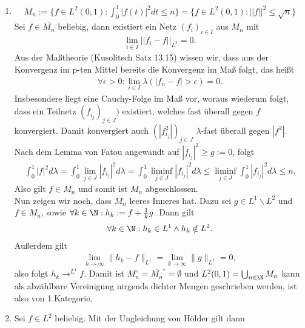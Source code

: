 \begin{solution}

\begin{enumerate}[label = (\roman*)]
\item \begin{align*}
  M_n := \{ f \in L^2(0,1): \int_0^1 |f(t)|^2dt \leq n \}
  = \{ f \in L^2(0,1): ||f||^2 \leq \sqrt{n}\}
\end{align*}
Sei $f \in \overline{M_n}$ beliebig, dann existiert ein Netz $(f_i)_{i \in I}$ aus $M_n$ mit
\begin{align*}
  \lim_{i \in I}||f_i - f||_{L^2} = 0.
\end{align*}
Aus der Maßtheorie (Kusolitsch Satz 13.15) wissen wir, dass aus der Konvergenz im
p-ten Mittel bereits die Konvergenz im Maß folgt, das heißt
\begin{align*}
  \forall \epsilon > 0: \lim_{i \in I} \lambda(|f_n - f| > \epsilon) = 0.
\end{align*}
Insbesondere liegt eine Cauchy-Folge im Maß vor, woraus wiederum folgt, dass ein
Teilnetz $(f_{i_j})_{j \in J})$ existiert, welches fast überall gegen $f$ konvergiert.
Damit konvergiert auch $(|f_{i_j}^2|)_{j \in J}$ $\lambda$-fast überall gegen $|f^2|$.
Nach dem Lemma von Fatou angewandt auf $|f_{i_j}|^2 \geq g := 0$, folgt
\begin{align*}
  \int_0^1 |f|^2 d\lambda = \int_0^1 \lim_{j \in J}|f_{i_j}|^2 d\lambda
  = \int_0^1 \liminf_{j \in J}|f_{i_j}|^2 d\lambda \leq \liminf_{j \in J} \int_0^1 |f_{i_j}|^2 d\lambda \leq n.
\end{align*}
Also gilt $f \in M_n$ und somit ist $M_n$ abgeschlossen. \\
Nun zeigen wir noch, dass $M_n$ leeres Inneres hat. Dazu sei $g \in L^1\backslash L^2$
und $f \in M_n$, sowie $\forall k \in \N: h_k := f + \frac{1}{k}g$. Dann gilt
\begin{align*}
  \forall k \in \N: h_k \in L^1 \land h_k \notin L^2.
\end{align*}
Außerdem gilt
\begin{align*}
  \lim_{h \rightarrow \infty}\|h_k - f\|_{L^1} = \lim_{k \rightarrow \infty} \|g\|_{L^1} = 0,
\end{align*}
also folgt $h_k \rightarrow^{L^1} f$. Damit ist $M_n^{\circ} = \overline{M_n}^{\circ} = \emptyset$
und $L^2(0,1) = \bigcup_{n \in \N}M_n$ kann als abzählbare Vereinigung nirgends dichter
Mengen geschrieben werden, ist also von 1.Kategorie.
\item Sei $f \in L^2$ beliebig. Mit der Ungleichung von Hölder gilt dann

\end{enumerate}
\end{solution}
